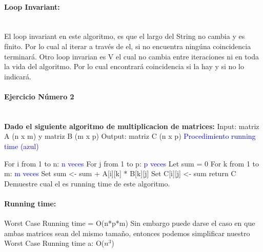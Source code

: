 \documentclass{article}
\begin{document}
\paragraph{Loop Invariant: } ~\\ \newline
\indent El loop invariant en este algoritmo, es que el largo del String no cambia y es fínito. Por lo cual al iterar a través de el, si no encuentra ningúna coincidencia terminará.  \newline
\indent Otro loop invarian es  V el cual no cambia entre iteraciones ni en toda la vida del algoritmo. Por lo cual encontrará coincidencia si la hay y si no lo indicará. 
\pagebreak


\paragraph{Ejercicio Número 2} ~\\ \newline
\textbf{Dado el siguiente algoritmo de multiplicacion de matrices:} \newline
Input: matriz A (n x m) y matriz B (m x p) \newline
Output: matriz C (n x p) \newline
\textcolor{blue}{Procedimiento running time (azul)} \bigskip \newline

\indent For i from 1 to n: \textcolor{blue}{ n veces } \newline
\indent \indent	For j from 1 to p:   \textcolor{blue}{ p veces }\newline
\indent \indent \indent		Let sum = 0 \newline
\indent \indent \indent		For k from 1 to m:  \textcolor{blue}{ m veces }  \newline
\indent \indent \indent \indent		Set sum <- sum + A[i][k] * B[k][j] \newline
\indent \indent \indent		Set C[i][j] <- sum \newline
\indent return C \newline 
\bigskip \newline
Demuestre cual el es running time de este algoritmo.

\paragraph{Running time:}
Worst Case Running time = O(n*p*m) \newline
Sin embargo puede darse el caso en que ambas matrices sean del mismo tamaño, entonces podemos simplificar nuestro Worst Case Running time a: O($n^3$)
\pagebreak
\end{document}
